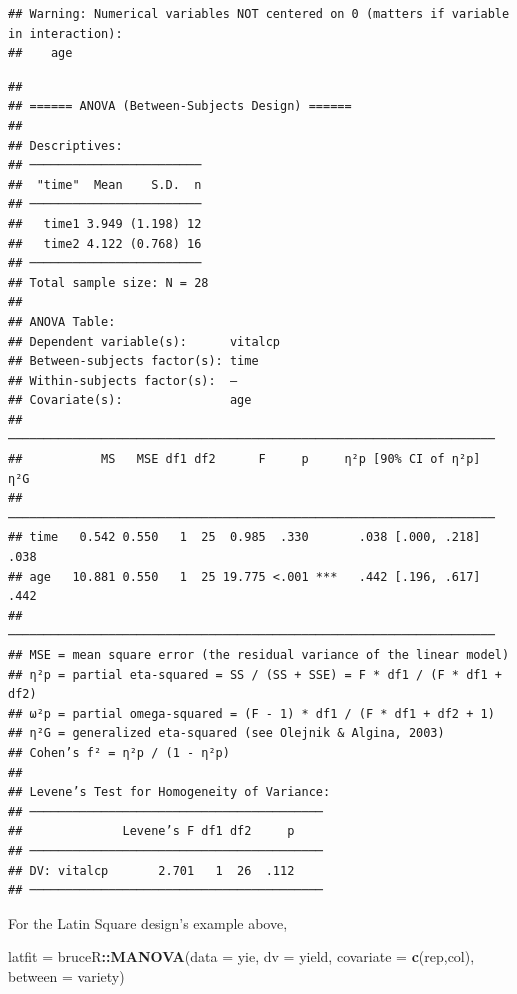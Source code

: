 \documentclass[
]{ctexart}
\newenvironment{Shaded}{\begin{snugshade}}{\end{snugshade}}
\newcommand{\AttributeTok}[1]{\textcolor[rgb]{0.13,0.29,0.53}{#1}}
\newcommand{\FunctionTok}[1]{\textcolor[rgb]{0.13,0.29,0.53}{\textbf{#1}}}
\newcommand{\NormalTok}[1]{#1}
\newcommand{\OtherTok}[1]{\textcolor[rgb]{0.56,0.35,0.01}{#1}}
\newcommand{\SpecialCharTok}[1]{\textcolor[rgb]{0.81,0.36,0.00}{\textbf{#1}}}
\newcommand{\StringTok}[1]{\textcolor[rgb]{0.31,0.60,0.02}{#1}}
\begin{document}
\begin{verbatim}
## Warning: Numerical variables NOT centered on 0 (matters if variable in interaction):
##    age
\end{verbatim}

\begin{verbatim}
## 
## ====== ANOVA (Between-Subjects Design) ======
## 
## Descriptives:
## ────────────────────────
##  "time"  Mean    S.D.  n
## ────────────────────────
##   time1 3.949 (1.198) 12
##   time2 4.122 (0.768) 16
## ────────────────────────
## Total sample size: N = 28
## 
## ANOVA Table:
## Dependent variable(s):      vitalcp
## Between-subjects factor(s): time
## Within-subjects factor(s):  –
## Covariate(s):               age
## ────────────────────────────────────────────────────────────────────
##           MS   MSE df1 df2      F     p     η²p [90% CI of η²p]  η²G
## ────────────────────────────────────────────────────────────────────
## time   0.542 0.550   1  25  0.985  .330       .038 [.000, .218] .038
## age   10.881 0.550   1  25 19.775 <.001 ***   .442 [.196, .617] .442
## ────────────────────────────────────────────────────────────────────
## MSE = mean square error (the residual variance of the linear model)
## η²p = partial eta-squared = SS / (SS + SSE) = F * df1 / (F * df1 + df2)
## ω²p = partial omega-squared = (F - 1) * df1 / (F * df1 + df2 + 1)
## η²G = generalized eta-squared (see Olejnik & Algina, 2003)
## Cohen’s f² = η²p / (1 - η²p)
## 
## Levene’s Test for Homogeneity of Variance:
## ─────────────────────────────────────────
##              Levene’s F df1 df2     p    
## ─────────────────────────────────────────
## DV: vitalcp       2.701   1  26  .112    
## ─────────────────────────────────────────
\end{verbatim}

For the Latin Square design's example above,

\begin{Shaded}
\begin{Highlighting}[]
\NormalTok{latfit }\OtherTok{=}\NormalTok{ bruceR}\SpecialCharTok{::}\FunctionTok{MANOVA}\NormalTok{(}\AttributeTok{data =}\NormalTok{ yie, }
                        \AttributeTok{dv =} \StringTok{\textquotesingle{}yield\textquotesingle{}}\NormalTok{, }
                        \AttributeTok{covariate =} \FunctionTok{c}\NormalTok{(}\StringTok{\textquotesingle{}rep\textquotesingle{}}\NormalTok{,}\StringTok{\textquotesingle{}col\textquotesingle{}}\NormalTok{),}
                        \AttributeTok{between =} \StringTok{\textquotesingle{}variety\textquotesingle{}}\NormalTok{)}
\end{Highlighting}
\end{Shaded}
\end{document}
